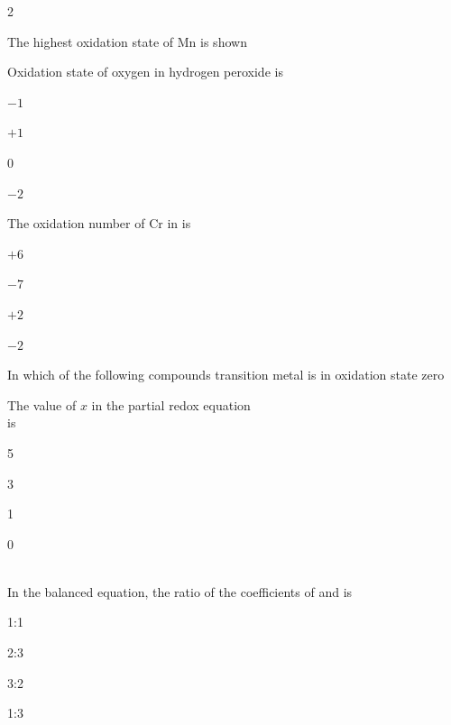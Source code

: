 \documentclass[10pt,a4paper]{article}
\begin{document}
\begin{multicols}{2}
\begin{questions}[start=1]
\item The highest oxidation state of Mn is shown
\begin{options}
  \item {}
  \item {}
  \item {}
  \item {}
\end{options}

\item Oxidation state of oxygen in hydrogen peroxide is
\begin{options}
  \item $-1$
  \item $+1$
  \item 0
  \item $-2$
\end{options}

\item The oxidation number of Cr in  is
\begin{options}
  \item $+6$
  \item $-7$
  \item $+2$
  \item $-2$
\end{options}

\item In which of the following compounds transition metal is in oxidation state zero
\begin{options}
  \item {}
  \item {}
  \item \ce{[Ni(CO)4]}
  \item {}
\end{options}

\item The value of $x$ in the partial redox equation\\
 is
\begin{options}
  \item 5
  \item 3
  \item 1
  \item 0
\end{options}

\item {}\\
In the balanced equation, the ratio of the coefficients of  and  is
\begin{options}
  \item 1:1
  \item 2:3
  \item 3:2
  \item 1:3
\end{options}


\end{questions}
\end{multicols}
\end{document}
